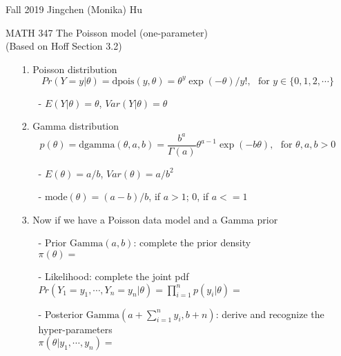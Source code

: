 \documentclass[11pt]{article}
\begin{document}
\enlargethispage{\baselineskip}

Fall 2019 \hfill Jingchen (Monika) Hu\\

\begin{center}
{\huge MATH 347 The Poisson model (one-parameter)}\\
(Based on Hoff Section 3.2)	
\end{center}
\vspace{0.5cm}


\begin{enumerate}


\item[1.] Poisson distribution
$$Pr(Y = y | \theta) = \textrm{dpois}(y, \theta) = \theta^y \exp(-\theta)/y!,\:\:\: \text{for $y\in\{0, 1, 2, \cdots\}$}$$
\begin{itemize}
\item[-] $E(Y|\theta) = \theta$, $Var(Y|\theta) = \theta$
\end{itemize}
\vspace{3mm}
\item[2.] Gamma distribution
$$p(\theta) = \textrm{dgamma}(\theta, a, b) = \frac{b^a}{\Gamma(a)}\theta^{a-1}\exp(-b\theta),\:\:\: \text{for $\theta, a, b > 0$}$$
\begin{itemize}
\item[-] $E(\theta) = a/b$, $Var(\theta) = a/b^2$
\item[-] $\textrm{mode}(\theta) = (a-b)/b$, if $a>1$; 0, if $a<=1$
\end{itemize}
\vspace{3mm}
\item[3.] Now if we have a Poisson data model and a Gamma prior
\begin{itemize}
\item[-] Prior $\textrm{Gamma}(a, b)$: complete the prior density\\
$\pi(\theta) = $
\vspace{10mm}
\item[-] Likelihood: complete the joint pdf\\
$Pr(Y_1=y_1, \cdots, Y_n=y_n|\theta) = \prod_{i=1}^{n}p(y_i|\theta) = $
\vspace{10mm}
\item[-] Posterior $\textrm{Gamma}(a+\sum_{i=1}^{n}y_i, b+n)$: derive and recognize the hyper-parameters\\
$\pi(\theta|y_1, \cdots, y_n) = $
\vspace{30mm}
\end{itemize}


\end{enumerate}
\end{document}
